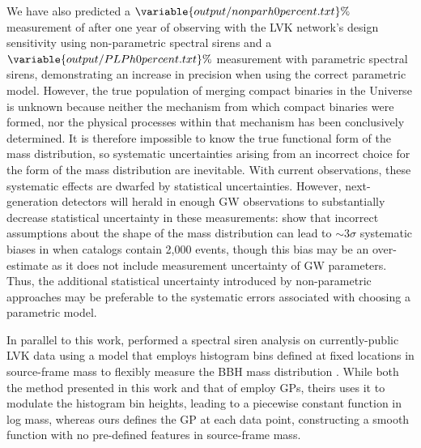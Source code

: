 \documentclass[preprint2,linenumbers]{aastex631}
\begin{document}
We have also predicted a $\variable{output/nonparh0percent.txt}\%$ measurement of \Ho{} after one year of observing with the \ac{LVK} network's design sensitivity using non-parametric spectral sirens and a $\variable{output/PLPh0percent.txt}\%$ 
measurement with parametric spectral sirens, demonstrating an increase in precision when using the correct parametric model.
However, the true population of merging compact binaries in the Universe is unknown because neither the mechanism from which compact binaries were formed, nor the physical processes within that mechanism has been conclusively determined.
It is therefore impossible to know the true functional form of the mass distribution, so systematic uncertainties arising from an incorrect choice for the form of the mass distribution are inevitable.
With current observations, these systematic effects are dwarfed by statistical uncertainties.
However, next-generation detectors will herald in enough \ac{GW} observations to substantially decrease statistical uncertainty in these measurements: \citet{pierra_study_2023} show that incorrect assumptions about the shape of the mass distribution can lead to $\sim3\sigma$ systematic biases in \Ho{} when catalogs contain 2,000 events, though this bias may be an over-estimate as it does not include measurement uncertainty of \ac{GW} parameters.
Thus, the additional statistical uncertainty introduced by non-parametric approaches may be preferable to the systematic errors associated with choosing a parametric model.

In parallel to this work, \citet{magana_inprep} performed a spectral siren analysis on currently-public \ac{LVK} data using a model that employs histogram bins defined at fixed locations in source-frame mass to flexibly measure the \ac{BBH} mass distribution \citep[originally presented in][]{mandel_model-independent_2017,ray_non-parametric_2023}.
While both the method presented in this work and that of \citet{magana_inprep} employ \acp{GP}, theirs uses it to modulate the histogram bin heights, leading to a piecewise constant function in log mass, whereas ours defines the \ac{GP} at each data point, constructing a smooth function with no pre-defined features in source-frame mass. 
\end{document}
